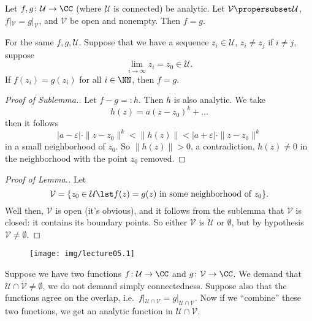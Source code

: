 \begin{lem}
Let $f,g\colon\mathcal{U}\to\CC$ (where $\mathcal{U}$ is
connected) be analytic. Let
$\mathcal{V}\propersubset\mathcal{U}$,
$f|_{\mathcal{V}}=g|_{\mathcal{V}}$, and $\mathcal{V}$ be open
and nonempty. Then $f=g$.
\end{lem}
\begin{lem}[``Sublemma'']
For the same $f,g,\mathcal{U}$. Suppose that we have a sequence
$z_{i}\in\mathcal{U}$, $z_{i}\not=z_{j}$ if $i\not=j$, suppose 
\begin{equation}
\lim_{i\to\infty}z_{i}=z_{0}\in\mathcal{U}.
\end{equation}
If $f(z_{i})=g(z_{i})$ for all $i\in\NN$, then $f=g$.
\end{lem}
\begin{proof}[Proof of Sublemma.]
Let $f-g=: h$. Then $h$ is also analytic. We take
\begin{equation}
h(z)=a(z-z_{0})^{k}+\dots
\end{equation}
then it follows
\begin{equation}
|a-\varepsilon|\cdot\|z-z_{0}\|^{k}<\|h(z)\|<|a+\varepsilon|\cdot\|z-z_{0}\|^{k}
\end{equation}
in a small neighborhood of $z_{0}$. So $\|h(z)\|>0$, a
contradiction, $h(z)\not=0$ in the neighborhood with the point
$z_{0}$ removed.
\end{proof}
\begin{proof}[Proof of Lemma.]
Let 
\begin{equation}
\mathcal{V}=\{z_{0}\in\mathcal{U}\lst f(z)=g(z)\mbox{ in some
  neighborhood of }z_{0}\}.
\end{equation}
Well then, $\mathcal{V}$ is open (it's obvious), and it follows
from the sublemma that $\mathcal{V}$ is closed: it contains its
boundary points. So either $\mathcal{V}$ is $\mathcal{U}$ or
$\emptyset$, but by hypothesis $\mathcal{V}\not=\emptyset$.
\end{proof}

\begin{wrapfigure}{r}{2in}
\vspace{-30pt}
\begin{center}
\texttt{[image: img/lecture05.1]}
\end{center}
\vspace{-20pt}
\end{wrapfigure}
Suppose we have two functions $f\colon\mathcal{U}\to\CC$ and
$g\colon\mathcal{V}\to\CC$. We demand that
$\mathcal{U}\cap\mathcal{V}\not=\emptyset$, we do not demand
simply connectedness. Suppose also that the functions agree on
the overlap, i.e.\ $f|_{\mathcal{U}\cap\mathcal{V}}=g|_{\mathcal{U}\cap\mathcal{V}}$.
Now if we ``combine'' these two functions, we get an analytic
function in $\mathcal{U}\cap\mathcal{V}$.

